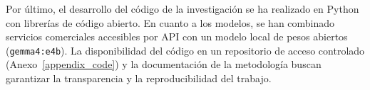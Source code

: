 Por último, el desarrollo del código de la investigación se ha realizado en Python con librerías de código abierto. En cuanto a los modelos, se han combinado servicios comerciales accesibles por API con un modelo local de pesos abiertos (\texttt{gemma4:e4b}). La disponibilidad del código en un repositorio de acceso controlado (Anexo~\ref{appendix_code}) y la documentación de la metodología buscan garantizar la transparencia y la reproducibilidad del trabajo.

\newpage